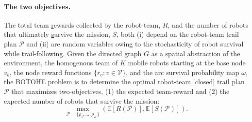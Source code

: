 \documentclass[11pt, oneside]{article}
\begin{document}
\paragraph{The two objectives.}
The total team \underline{r}ewards collected by the robot-team, $R$, and the number of robots that ultimately \underline{s}urvive the mission, $S$, both (i) depend on the robot-team trail plan $\mathcal{P}$ and (ii) are random variables owing to the stochasticity of robot survival while trail-following.
Given 
the directed graph $G$ as a spatial abstraction of the environment, 
the homogenous team of $K$ mobile robots starting at the base node $v_b$,
the node reward functions $\{r_v : v \in\mathcal{V}\}$, 
and the arc survival probability map $\omega$, 
the BOTOHE problem is to determine the optimal robot-team [closed] trail plan $\mathcal{P}$ that maximizes two-objectives, (1) the expected team-reward and (2) the expected number of robots that survive the mission:
\begin{equation}
\max_{\mathcal{P}=\{\rho_1, ..., \rho_K\}} \left( \mathbb{E}[R(\mathcal{P})], \mathbb{E}[S(\mathcal{P})] \right).
\label{eq:the_two_objs}
\end{equation}

%
%
\end{document}
